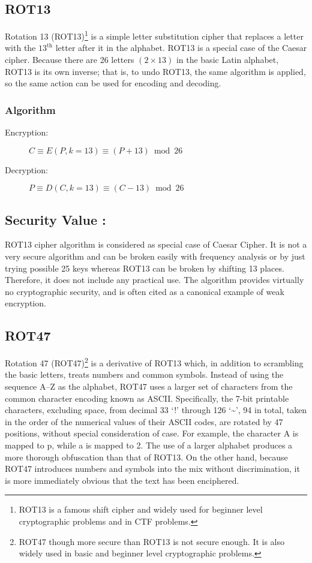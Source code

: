 \documentclass[british]{report}
\begin{document}
\subsection{ROT13}

Rotation 13 (ROT13)\footnote{ROT13 is a famous shift cipher and widely used for beginner level
	cryptographic problems and in CTF problems.} is a simple letter substitution cipher that replaces a letter with
the $13^{\text{th}}$ letter after it in the alphabet. ROT13 is a
special case of the Caesar cipher. Because there are 26 letters $(2\times13)$
in the basic Latin alphabet, ROT13 is its own inverse; that is, to
undo ROT13, the same algorithm is applied, so the same action can
be used for encoding and decoding.

\subsubsection{Algorithm}
\begin{description}
	\item [{Encryption:}] $C\equiv E(P,k=13)\equiv(P+13)\bmod26$
	\item [{Decryption:}] $P\equiv D(C,k=13)\equiv(C-13)\bmod26$
\end{description}

\subsection{Security Value : }

ROT13 cipher algorithm is considered as special case of Caesar Cipher.
It is not a very secure algorithm and can be broken easily with frequency
analysis or by just trying possible 25 keys whereas ROT13 can be broken
by shifting 13 places. Therefore, it does not include any practical
use. The algorithm provides virtually no cryptographic security, and
is often cited as a canonical example of weak encryption.

\vfill{}


\subsection{ROT47}

Rotation 47 (ROT47)\footnote{ROT47 though more secure than ROT13 is not secure enough. It is also
	widely used in basic and beginner level cryptographic problems.} is a derivative of ROT13 which, in addition to scrambling the basic
letters, treats numbers and common symbols. Instead of using the sequence
A--Z as the alphabet, ROT47 uses a larger set of characters from
the common character encoding known as ASCII. Specifically, the 7-bit
printable characters, excluding space, from decimal 33 `!' through
126 `\textasciitilde ', 94 in total, taken in the order of the
numerical values of their ASCII codes, are rotated by 47 positions,
without special consideration of case. For example, the character
A is mapped to p, while a is mapped to 2. The use of a larger alphabet
produces a more thorough obfuscation than that of ROT13. On the other
hand, because ROT47 introduces numbers and symbols into the mix without
discrimination, it is more immediately obvious that the text has been
enciphered.
\end{document}
